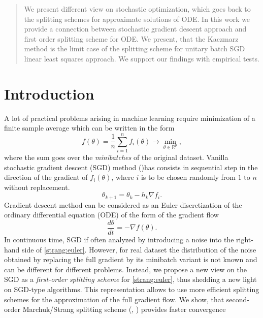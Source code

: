 \documentclass{article}
\begin{document}
\begin{abstract}
We present different view on stochastic optimization, which goes back to the splitting schemes for approximate solutions of ODE. In this work we provide a connection between stochastic gradient descent approach and first order splitting scheme for ODE. We present, that the Kaczmarz method is the limit case of the splitting scheme for unitary batch SGD linear least squares approach. We support our findings with empirical tests.
\end{abstract}

\section{Introduction}
A lot of practical problems arising in machine learning require minimization of a finite sample average which can be written in the form
\begin{equation}\label{strang:finitesum}
    f(\theta) = \frac{1}{n} \sum_{i=1}^n f_i(\theta) \rightarrow \min_{\theta \in \mathbb{R}^p},
\end{equation}
where the sum goes over the \emph{minibatches} of the original dataset. Vanilla stochastic gradient descent (SGD) method (\cite{robbins1951stochastic})has consists in sequential step in the direction of the gradient of $f_i(\theta)$, where $i$ is to be chosen randomly from $1$ to $n$ without replacement.
$$
\theta_{k+1} = \theta_{k} - h_{k} \nabla f_i.
$$
Gradient descent method can be considered as an Euler discretization of the ordinary differential equation (ODE) of the form of the gradient flow
\begin{equation}\label{strang:euler}
    \frac{d \theta}{d t} = -\nabla f(\theta).
\end{equation}
In continuous time, SGD if often analyzed by introducing a noise into the right-hand side of \eqref{strang:euler}. However, for real dataset the distribution of the noise obtained by replacing the full gradient by its minibatch variant is not known and can be different for different problems. Instead, we propose a new view on the SGD as a \emph{first-order splitting scheme} for \eqref{strang:euler}, thus shedding a new light on SGD-type algorithms. This representation allows to use more efficient splitting schemes for the approximation of the full gradient flow. We show, that second-order Marchuk/Strang splitting scheme (\cite{marchuk1968some}, \cite{strang1968construction}) provides faster convergence 

\end{document}
